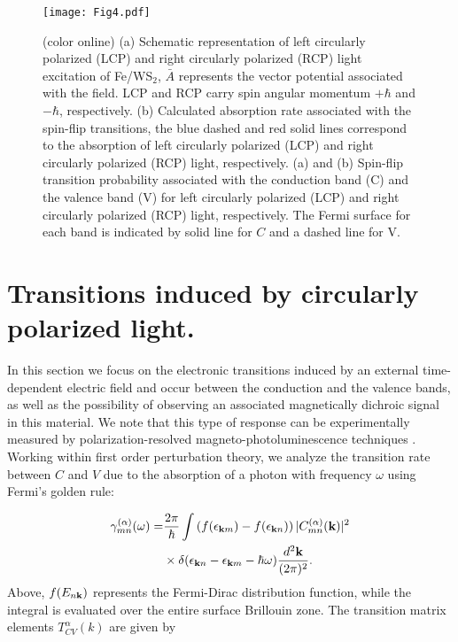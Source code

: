 \documentclass[aps,prb,showpacs,preprintnumbers,twocolumn,amsmath,amssymb]{revtex4-1}
\begin{document}
\begin{figure*}[t]
\centering
    
\texttt{[image: Fig4.pdf]}
\caption{(color online) (a) Schematic representation of left circularly polarized (LCP) and right circularly polarized (RCP) light excitation of Fe/WS$_{2}$, $\bar{A}$ represents the vector potential associated with the field. LCP and RCP carry spin angular momentum $+\hbar$ and $-\hbar$, respectively. (b) Calculated absorption rate associated with the spin-flip transitions, the blue dashed and red solid lines correspond to the absorption of left circularly polarized (LCP) and right circularly polarized (RCP) light, respectively. (a) and (b) Spin-flip transition probability associated  with the conduction band (C) and the valence band (V) for left circularly polarized (LCP) and right circularly polarized (RCP) light, respectively. The Fermi surface for each band is indicated by solid line for $C$ and a dashed line for V.}
\label{fig:MatrixElem}

\end{figure*}
\section{Transitions induced by circularly polarized light.} In this section we focus on the electronic transitions induced by an external time-dependent electric field and occur between the conduction and the valence bands, as well as the possibility of observing an associated magnetically dichroic signal in this material. We note that this type of response can be experimentally measured by polarization-resolved magneto-photoluminescence techniques \cite{Srivastava2015,Li2014}. Working within first order perturbation theory, we analyze the transition rate between $C$ and $V$ due to the absorption of a photon with frequency $\omega$ using Fermi's golden rule:

\begin{equation}\label{eq:tr-rate}
\begin{split}
\gamma^{(\alpha)}_{m  n  }(\omega)=&\dfrac{2\pi}{\hbar}\int 
\left( f(\epsilon_{{\bf k}m})-f(\epsilon_{{\bf k}n}) \right)
 |C^{(\alpha)}_{m n}(\textbf{k})|^{2} \\
&\times \delta(\epsilon_{{\bf k}n}-\epsilon_{\textbf{k}m}-\hbar\omega)\frac{d^{2}{\bf k}}{(2\pi)^{2}}
.
\end{split}
\end{equation}
Above, $f(E_{n\bf k})$ represents the Fermi-Dirac distribution function, while the integral is evaluated over the entire surface Brillouin zone. The transition matrix elements 
$T^{\alpha}_{CV}(k)$ are given by \cite{Rashba2003a,Ibanez-Azpiroz2013}
\end{document}
